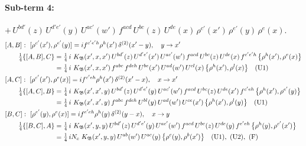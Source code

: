 \documentclass[10pt]{article}
\numberwithin{equation}{section}
\begin{document}
\paragraph{Sub-term 4:} $+\,U^{bd'}(z)\,U^{d'e'}(y)\,U^{ac'}(w')\,f^{acd}\,U^{bc}(z)\,U^{de}(x)\,\rho^{c'}(x')\,\rho^{e'}(y)\,\rho^{e}(x)$.
\begin{align}
&[A,B]:\ [\rho^{c'}(x'),\rho^{e'}(y)]=i f^{c'e'h}\rho^{h}(x')\,\delta^{(2)}(x'-y),\quad y\to x'\notag\\
&\qquad \tfrac14\{[A,B],C\}=\tfrac14\,i\,\,K_{\mathfrak B}(x',x,x')\,U^{bd'}(z)\,U^{d'e'}(x')\,U^{ac'}(w')\,f^{acd}\,U^{bc}(z)\,U^{de}(x)\,f^{c'e'h}\,\big\{\rho^{h}(x'),\rho^{e}(x)\big\}\notag\\
&\qquad\phantom{\tfrac14\{[A,B],C\}}=\tfrac14\,i\,\,K_{\mathfrak B}(x',x,x')\,f^{abc}\,f^{deh}\,U^{be}(x')\,U^{ad}(w')\,U^{cl}(x)\,\big\{\rho^{h}(x'),\rho^{l}(x)\big\}\quad\text{(U1)}
\label{R:eq:GIII.I-4-AB}\\
&[A,C]:\ [\rho^{c'}(x'),\rho^{e}(x)]=i f^{c'eh}\rho^{h}(x')\,\delta^{(2)}(x'-x),\quad x\to x'\notag\\
&\qquad \tfrac14\{[A,C],B\}=\tfrac14\,i\,\,K_{\mathfrak B}(x',x',y)\,U^{bd'}(z)\,U^{d'e'}(y)\,U^{ac'}(w')\,f^{acd}\,U^{bc}(z)\,U^{de}(x')\,f^{c'eh}\,\big\{\rho^{h}(x'),\rho^{e'}(y)\big\}\notag\\
&\qquad\phantom{\tfrac14\{[A,C],B\}}=\tfrac14\,i\,\,K_{\mathfrak B}(x',x',y)\,f^{abc}\,f^{deh}\,U^{bl}(y)\,U^{ad}(w')\,U^{ce}(x')\,\big\{\rho^{h}(x'),\rho^{l}(y)\big\}\quad\text{(U1)}
\label{R:eq:GIII.I-4-AC}\\
&[B,C]:\ [\rho^{e'}(y),\rho^{e}(x)]=i f^{e'eh}\rho^{h}(y)\,\delta^{(2)}(y-x),\quad x\to y\notag\\
&\qquad \tfrac14\{[B,C],A\}=\tfrac14\,i\,\,K_{\mathfrak B}(x',y,y)\,U^{bd'}(z)\,U^{d'e'}(y)\,U^{ac'}(w')\,f^{acd}\,U^{bc}(z)\,U^{de}(y)\,f^{e'eh}\,\big\{\rho^{h}(y),\rho^{c'}(x')\big\}\notag\\
&\qquad\phantom{\tfrac14\{[B,C],A\}}=\tfrac14\,i N_{c}\,\,K_{\mathfrak B}(x',y,y)\,U^{ab}(w')\,U^{ac}(y)\,\big\{\rho^{c}(y),\rho^{b}(x')\big\}\quad\text{(U1)},\ \text{(U2)},\ \text{(F)}
\label{R:eq:GIII.I-4-BC}
\end{align}
\end{document}
